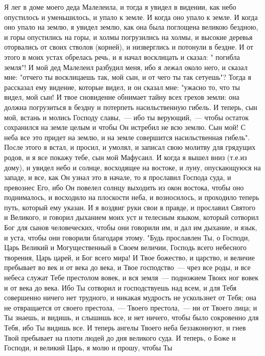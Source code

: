 Я лег в доме моего деда Малелеила, и тогда я увидел в видении, как небо
опустилось и уменьшилось, и упало к земле.
И когда оно упало к земле.
И когда оно упало на землю, я увидел землю, как она была поглощена
великою бездною, и горы опустились на горы, и холмы погрузились на холмы, и
высокие деревья оторвались от своих стволов (корней), и низверглись и потонули
в бездне.
И от этого в моих устах обрелась речь, и я начал восклицать и сказал: "
погибла земля"!
И мой дед Малелеил разбудил меня, ибо я лежал около него, и сказал мне:
"отчего ты восклицаешь так, мой сын, и от чего ты так сетуешь"?
Тогда я рассказал ему видение, которые видел, и он сказал мне: "ужасно
то, что ты видел, мой сын!
И твое сновидение обнимает тайну всех грехов земли: она должна
погрузиться в бездну и потерпеть насильственную гибель.
И теперь, сын мой, встань и молись Господу славы,~--- ибо ты верующий,~---
чтобы остаток сохранился на земле целым и чтобы Он истребил не всю землю.
Сын мой!
С неба все это придет на землю, и на земле совершится насильственная
гибель".
После этого я встал, и просил, и умолял, и записал свою молитву для
грядущих родов, и я все покажу тебе, сын мой Мафусаил.
И когда я вышел вниз (т.е.из дому), и увидел небо и солнце, восходящее
на востоке, и луну, опускающуюся на западе, и все, как Он узнал это в начале,
то я прославил Господа суда, и превознес Его, ибо Он повелел солнцу выходить из
окон востока, чтобы оно поднималось, и восходило на плоскости неба, и
возносилось, и проходило теперь путь, который ему указан.
И я воздвиг руки свои в правде, и прославил Святого и Великого, и
говорил дыханием моих уст и телесным языком, который сотворил Бог для сынов
человеческих, чтобы они говорили им, и дал им дыхание, и язык, и уста, чтобы
они говорили благодаря этому.
"Будь прославлен Ты, о Господи, Царь Великий и Могущественный в Своем
величии, Господь всего небесного творения, Царь царей, и Бог всего мира!
И Твое божество, и царство, и величие пребывает во век и от века до
века, и Твое господство~--- чрез все роды, и все небеса служат Тебе престолом
вовек, и вся земля~--- подножием Твоих ног вовек и от века до века.
Ибо Ты сотворил и господствуешь над всем, и для Тебя совершенно ничего
нет трудного, и никакая мудрость не ускользнет от Тебя; она не отвращается от
своего престола,~--- Твоего престола,~--- ни от Твоего лица; и Ты знаешь, и видишь,
и слышишь все, и нет ничего, чтобы было сокровенно для Тебя, ибо Ты видишь все.
И теперь ангелы Твоего неба беззаконнуют, и гнев Твой пребывает на
плоти людей до дня великого суда.
И теперь, о Боже и Господи, и великий Царь, я молю и прошу, чтобы Ты
